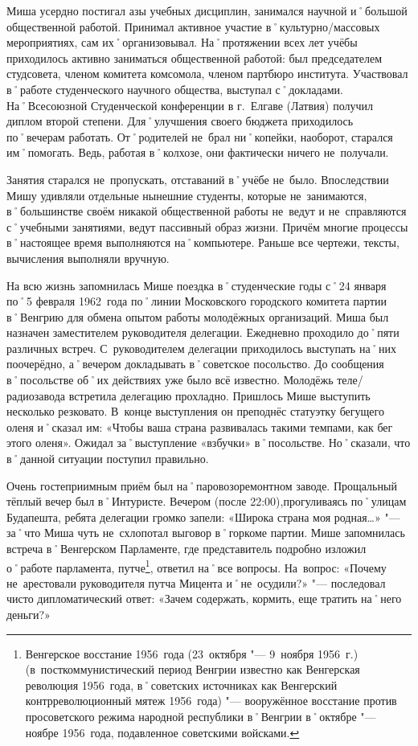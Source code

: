 Миша усердно постигал азы учебных дисциплин, занимался научной и˚большой общественной работой. Принимал активное участие в˚культурно\-/массовых мероприятиях, сам их˚организовывал. На˚протяжении всех лет учёбы приходилось активно заниматься общественной работой: был председателем студсовета, членом комитета комсомола, членом партбюро института. Участвовал в˚работе студенческого научного общества, выступал с˚докладами. На˚Всесоюзной Студенческой конференции в г.~Елгаве (Латвия) получил диплом второй степени. Для˚улучшения своего бюджета приходилось по˚вечерам работать. От˚родителей не~брал ни˚копейки, наоборот, старался им˚помогать. Ведь, работая в˚колхозе, они фактически ничего не~получали. 

Занятия старался не~пропускать, отставаний в˚учёбе не~было. Впоследствии Мишу удивляли отдельные нынешние студенты, которые не~занимаются, в˚большинстве своём никакой общественной работы не~ведут и не~справляются с˚учебными занятиями, ведут пассивный образ жизни. Причём многие процессы в˚настоящее время  выполняются на˚компьютере. Раньше все чертежи, тексты, вычисления выполняли вручную.

На всю жизнь запомнилась Мише поездка в˚студенческие годы с˚24 января по˚5 февраля 1962~года по˚линии Московского городского комитета партии в˚Венгрию для обмена опытом работы молодёжных организаций. Миша был назначен заместителем руководителя делегации. Ежедневно проходило до˚пяти различных встреч. С~руководителем делегации приходилось выступать на˚них поочерёдно, а˚вечером докладывать в˚советское посольство. До сообщения в˚посольстве об˚их действиях уже было всё известно. Молодёжь теле\-/радиозавода встретила делегацию прохладно. Пришлось Мише выступить несколько резковато. В~конце выступления он преподнёс статуэтку бегущего оленя и˚сказал им: «Чтобы ваша страна развивалась такими темпами, как бег этого оленя». Ожидал за˚выступление «взбучки» в˚посольстве. Но˚сказали, что в˚данной ситуации поступил правильно. 

Очень гостеприимным приём был на˚паровозоремонтном заводе. Прощальный тёплый вечер был в˚Интуристе. Вечером (после 22:00),прогуливаясь по˚улицам Будапешта, ребята делегации громко запели: «Широка страна моя родная…» "--- за˚что Миша чуть не~схлопотал выговор в˚горкоме партии. Мише запомнилась встреча в˚Венгерском Парламенте, где представитель подробно изложил о˚работе парламента, путче\footnote{Венгерское восстание 1956~года (23~октября "--- 9~ноября 1956~г.) (в~посткоммунистический период Венгрии известно как Венгерская революция 1956~года, в˚советских источниках как Венгерский контрреволюционный мятеж 1956~года) "--- вооружённое восстание против просоветского режима народной республики в˚Венгрии в˚октябре "--- ноябре 1956~года, подавленное советскими войсками.}, ответил на˚все вопросы. На~вопрос: «Почему не~арестовали руководителя путча Мицента и˚не~осудили?» "--- последовал чисто дипломатический ответ: «Зачем содержать, кормить, еще тратить на˚него деньги?»

